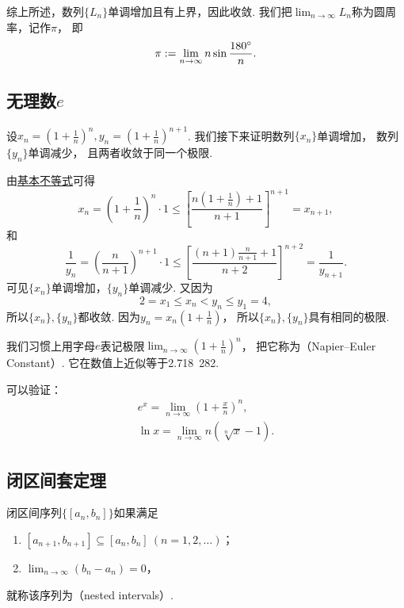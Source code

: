 综上所述，数列\(\{L_n\}\)单调增加且有上界，因此收敛.
我们把\(\lim_{n\to\infty} L_n\)称为圆周率，记作\(\pi\)，
即\[
	\pi := \lim_{n\to\infty} n \sin\frac{180^\circ}{n}.
\]


\subsection{无理数\texorpdfstring{$e$}{e}}\label{section:极限.无理数e}
设\(x_n=\left(1+\frac1n\right)^n,
y_n=\left(1+\frac1n\right)^{n+1}\).
我们接下来证明数列\(\{x_n\}\)单调增加，
数列\(\{y_n\}\)单调减少，
且两者收敛于同一个极限.

由\hyperref[theorem:不等式.基本不等式n几何平均数与算术平均数]{基本不等式}可得\[
	x_n = \left(1+\frac1n\right)^n \cdot 1
	\leq \left[\frac{n\left(1+\frac1n\right)+1}{n+1}\right]^{n+1} = x_{n+1},
\]
和\[
	\frac1{y_n} = \left(\frac{n}{n+1}\right)^{n+1} \cdot 1
	\leq \left[\frac{(n+1)\frac{n}{n+1}+1}{n+2}\right]^{n+2} = \frac1{y_{n+1}}.
\]
可见\(\{x_n\}\)单调增加，\(\{y_n\}\)单调减少.
又因为\[
	2 = x_1 \leq x_n < y_n \leq y_1 = 4,
\]
所以\(\{x_n\},\{y_n\}\)都收敛.
因为\(y_n=x_n\left(1+\frac1n\right)\)，
所以\(\{x_n\},\{y_n\}\)具有相同的极限.

我们习惯上用字母\(e\)表记极限\(\lim_{n\to\infty} \left(1+\frac1n\right)^n\)，
把它称为（Napier--Euler Constant）.
它在数值上近似等于{2.718~282}.

可以验证：\begin{gather}
	e^x = \lim_{n\to\infty} \left(1+\frac{x}{n}\right)^n,
	\label{equation:特殊函数.以e为底的指数函数} \\
	\ln x = \lim_{n\to\infty} n \left( \sqrt[n]{x} - 1 \right).
	\label{equation:特殊函数.以e为底的对数函数}
\end{gather}

\subsection{闭区间套定理}
\begin{definition}\label{definition:极限.闭区间套的定义}
闭区间序列\(\{[a_n,b_n]\}\)如果满足
\begin{enumerate}
	\item \([a_{n+1},b_{n+1}] \subseteq [a_n,b_n]\ (n=1,2,\dotsc)\)；
	\item \(\lim_{n\to\infty} (b_n - a_n) = 0\)，
\end{enumerate}
就称该序列为（nested intervals）.
\end{definition}

